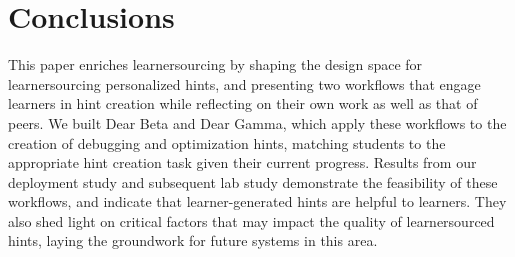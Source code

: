 
\section{Conclusions}
This paper enriches learnersourcing by shaping the design space for learnersourcing personalized hints, and presenting two workflows that engage learners in hint creation while reflecting on their own work as well as that of peers. We built Dear Beta and Dear Gamma, which apply these workflows to the creation of debugging and optimization hints, matching students to the appropriate hint creation task given their current progress. Results from our deployment study and subsequent lab study demonstrate the feasibility of these workflows, and indicate that learner-generated hints are helpful to learners. They also shed light on critical factors that may impact the quality of learnersourced hints, laying the groundwork for future systems in this area.